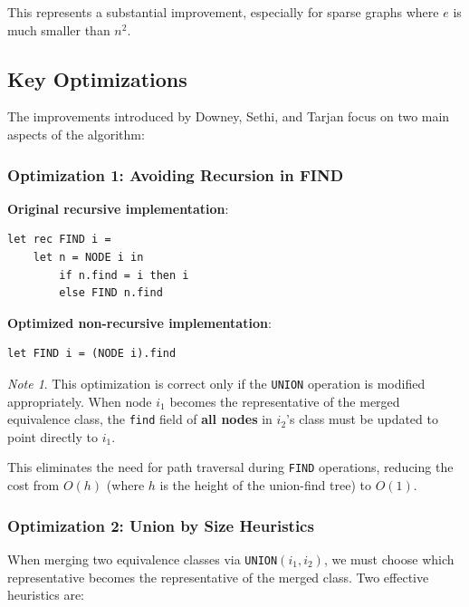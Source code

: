 \documentclass[11pt,a4paper]{article}
\theoremstyle{definition}
\theoremstyle{plain}
\theoremstyle{remark}
\newtheorem*{remark}{Note}
\begin{document}
This represents a substantial improvement, especially for sparse graphs where $e$ is much smaller than $n^2$.

\subsection{Key Optimizations}

The improvements introduced by Downey, Sethi, and Tarjan focus on two main aspects of the algorithm:

\subsubsection{Optimization 1: Avoiding Recursion in FIND}

\textbf{Original recursive implementation}:
\begin{verbatim}
let rec FIND i = 
    let n = NODE i in 
        if n.find = i then i 
        else FIND n.find
\end{verbatim}

\textbf{Optimized non-recursive implementation}:
\begin{verbatim}
let FIND i = (NODE i).find
\end{verbatim}

\begin{remark}
This optimization is correct only if the \texttt{UNION} operation is modified appropriately. When node $i_1$ becomes the representative of the merged equivalence class, the \texttt{find} field of \textbf{all nodes} in $i_2$'s class must be updated to point directly to $i_1$.

This eliminates the need for path traversal during \texttt{FIND} operations, reducing the cost from $O(h)$ (where $h$ is the height of the union-find tree) to $O(1)$.
\end{remark}

\subsubsection{Optimization 2: Union by Size Heuristics}

When merging two equivalence classes via \texttt{UNION}$(i_1, i_2)$, we must choose which representative becomes the representative of the merged class. Two effective heuristics are:
\end{document}
